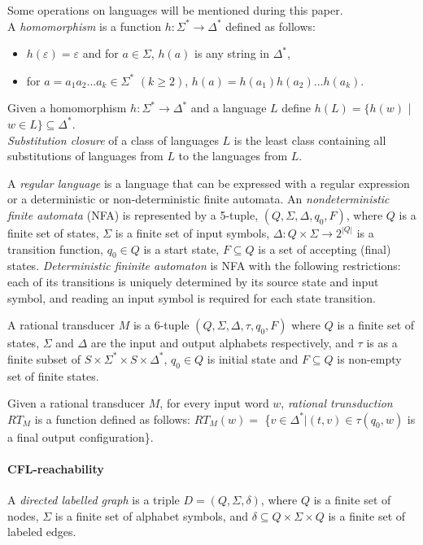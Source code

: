 Some operations on languages will be mentioned during this paper.
\\
A \textit{homomorphism} is a function $h: \Sigma^* \rightarrow \Delta^*$ defined as follows: 
\begin{itemize}
\item $h(\varepsilon) = \varepsilon$ and for $a \in \Sigma$, $h(a)$ is any string in $\Delta^*$,
\item for $a = a_1a_2 ... a_k \in \Sigma^*$ $(k \ge 2)$, $h(a) = h(a_1)h(a_2)... h(a_k)$.
\end{itemize}
Given a homomorphism $h: \Sigma^* \rightarrow \Delta^*$ and a language $L$ define $h(L)= \{h(w)$ | $w \in L\} \subseteq \Delta^*$.
\\
\textit{Substitution closure} of a class of languages $L$ is the least class containing all substitutions of languages from $L$ to the languages from $L$.


A \textit{regular language} is a language that can be expressed with a regular expression or a deterministic or non-deterministic finite automata.
An \textit{nondeterministic finite automata} (NFA) is represented by a 5-tuple, $(Q,\Sigma ,\Delta ,q_{0},F)$, where $Q$ is a finite set of states, $\Sigma$ is a finite set of input symbols, $\Delta:Q\times \Sigma \rightarrow 2^{|Q|}$ is a transition function, $q_0 \in Q$ is a start state, $F \subseteq Q$ is a set of accepting (final) states. \textit{Deterministic fininite automaton} is NFA with the following restrictions: each of its transitions is uniquely determined by its source state and input symbol, and reading an input symbol is required for each state transition.


A rational transducer $M$ is a 6-tuple $(Q, \Sigma, \Delta, \tau, q_0, F)$ where $Q$ is a finite set of states, $\Sigma$ and $\Delta$ are the input and output alphabets respectively, and $τ$ is as a finite subset of $S \times \Sigma^* \times S \times \Delta^*$, $q_0 \in Q$ is initial state and $F \subseteq Q$ is non-empty set of finite states.


Given a rational transducer $M$, for every input word $w$, \textit{rational trunsduction} $RT_M$ is a function defined as follows:
$RT_M(w) =$ \{$v \in \Delta^*|(t, v) \in \tau(q_0, w)$ is a final output configuration\}.
\paragraph{CFL-reachability} 
A \textit{directed labelled graph} is a triple $D = (Q, \Sigma, \delta)$, where $Q$ is a finite set of nodes, $\Sigma$ is a finite set of alphabet symbols,
and $\delta \subseteq Q \times \Sigma \times Q$ is a finite set of labeled edges. 


